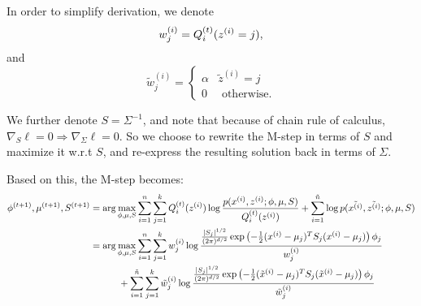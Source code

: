 \begin{answer}
\allowdisplaybreaks

In order to simplify derivation, we denote $$w_j^{(i)} = Q^{(t)}_i(z^{(i)}=j),$$ and $$\tilde{w}_j^{(i)} = \begin{cases} \alpha & \tilde{z}^{(i)} = j \\ 0 & \text{ otherwise.} \end{cases}$$

We further denote $S = \Sigma^{-1}$, and note that because of chain rule of calculus, $\nabla_S\ell = 0 \Rightarrow \nabla_\Sigma \ell = 0$. So we choose to rewrite the M-step in terms of $S$ and maximize it w.r.t $S$, and re-express the resulting solution back in terms of $\Sigma$.

Based on this, the M-step becomes:
\begin{align*}
\phi^{(t+1)}, \mu^{(t+1)}, S^{(t+1)} &=  \arg\max_{\phi,\mu,S} \sum_{i=1}^{n} \sum_{j=1}^k Q_i^{(t)}(z^{(i)}) \log \frac{p(x^{(i)},z^{(i)};\phi,\mu,S)}{Q_i^{(t)}(z^{(i)})} + \sum_{i=1}^{\tilde{{n}}} \log p(\tilde{x^{(i)}}, \tilde{z^{(i)}}; \phi, \mu, S)\\
&=\arg\max_{\phi, \mu, S} \sum_{i=1}^{n} \sum_{j=1}^k w^{(i)}_j \log \frac{ \frac{|S_j|^{1/2}}{(2\pi)^{{d}/2}} \exp\left(-\frac{1}{2}(x^{(i)}-\mu_j)^TS_j(x^{(i)}-\mu_j)\right) \phi_j}{w^{(i)}_j } \\
&\quad\quad\quad +\sum_{i=1}^{\tilde{{n}}} \sum_{j=1}^k \tilde{w}^{(i)}_j \log \frac{ \frac{|S_j|^{1/2}}{(2\pi)^{{d}/2}} \exp\left(-\frac{1}{2}(\tilde{x}^{(i)}-\mu_j)^TS_j(\tilde{x}^{(i)}-\mu_j)\right) \phi_j}{\tilde{w}^{(i)}_j } \\
\end{align*}


\end{answer}
